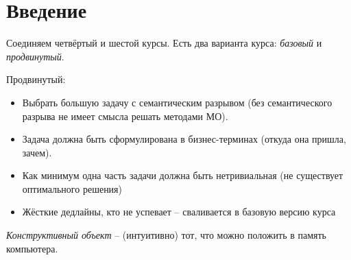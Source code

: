 \documentclass[main.tex]{sufbfiles}
\begin{document}
	
\section{Введение}

Соединяем четвёртый и шестой курсы.
Есть два варианта курса: \emph{базовый} и \emph{продвинутый}.

Продвинутый:
\begin{itemize}[noitemsep]
	\item Выбрать большую задачу с семантическим разрывом (без семантического разрыва не имеет смысла решать методами МО).
	\item Задача должна быть сформулирована в бизнес-терминах (откуда она пришла, зачем).
	\item Как минимум одна часть задачи должна быть нетривиальная (не существует оптимального решения)
	\item Жёсткие дедлайны, кто не успевает -- сваливается в базовую версию курса
\end{itemize}

\emph{Конструктивный объект} -- (интуитивно) тот, что можно положить в память компьютера.
\end{document}
